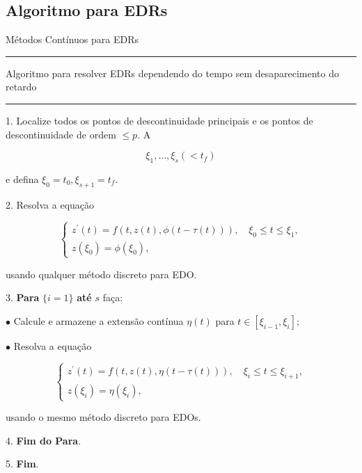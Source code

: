 \documentclass{beamer}
\theoremstyle{plain}
\theoremstyle{definition}
\begin{document}
\subsection{Algoritmo para EDRs}
\begin{frame}{Métodos Contínuos para EDRs}

    \tiny
    \setlength{\columnseprule}{0.4pt}
    \noindent\rule{\textwidth}{0.4pt}
    Algoritmo para resolver EDRs dependendo do tempo sem desaparecimento do retardo
    \noindent\rule{\textwidth}{0.4pt}
    \begin{multicols}{2}
        \phantom{aa} 1. Localize todos os pontos de descontinuidade
        \phantom{aa 1.} principais e os pontos de descontinuidade de 
        \phantom{aaala}  ordem $\leq p$. A

        \[
            \xi_1, \ldots, \xi_s\left(<t_f\right)
        \]

        \noindent
        \phantom{aa 1.} e defina $\xi_0=t_0, \xi_{s+1}=t_f$.

        \phantom{aa} 2. Resolva a equação

            \noindent
            \[
                \left\{\begin{array}{l}
                        z^{\prime}(t)=f(t, z(t), \phi(t-\tau(t))), \quad \xi_0 \leq t \leq \xi_1, \\
                        z\left(\xi_0\right)=\phi\left(\xi_0\right),
                \end{array}\right.
            \]

        \phantom{aaa 2.} usando qualquer método discreto para EDO.  

        \phantom{aa} 3.   \textbf{Para} $\{ i = 1\}$ \textbf{até} $s$ faça:

        \phantom{aaaaaa}$\bullet$ Calcule e armazene a extensão contínua $\eta(t)$ 
        \phantom{aaaaaa} para $t \in\left[\xi_{i-1}, \xi_i\right]$;

        \phantom{aaaaaa}$\bullet$ Resolva a equação

        \noindent
        \[
            \left\{\begin{array}{l}
                    z^{\prime}(t)=f(t, z(t), \eta(t-\tau(t))), \quad \xi_i \leq t \leq \xi_{i+1}, \\
                    z\left(\xi_i\right)=\eta\left(\xi_i\right),
            \end{array}\right.
        \]

        \phantom{aaaaaaa$\bullet$}usando o mesmo método discreto para EDOs.

        \phantom{aa} 4. \textbf{Fim do Para}.

        \phantom{aa} 5. \textbf{Fim}.

\end{multicols}

\end{frame}
\end{document}
